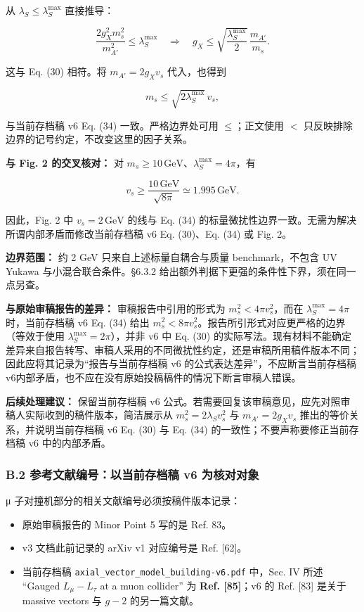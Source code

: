 \documentclass[
]{article}
\providecommand{\tightlist}{%
  \setlength{\itemsep}{0pt}\setlength{\parskip}{0pt}}
\begin{document}
从 \(\lambda_S\leq\lambda_S^{\max}\) 直接推导：

\[
\frac{2g_X^2m_s^2}{m_{A'}^2}\leq\lambda_S^{\max}
\quad\Longrightarrow\quad
 g_X\leq\sqrt{\frac{\lambda_S^{\max}}{2}}\,\frac{m_{A'}}{m_s}.
\]

这与 Eq. (30) 相符。将 \(m_{A'}=2g_Xv_s\) 代入，也得到

\[
 m_s\leq\sqrt{2\lambda_S^{\max}}\,v_s,
\tag{34}
\]

与当前存档稿 v6 Eq. (34) 一致。严格边界处可用 \(\leq\)；正文使用 \(<\)
只反映排除边界的记号约定，不改变这里的因子关系。

\textbf{与 Fig. 2 的交叉核对：} 对
\(m_s\geq10\,\mathrm{GeV}\)、\(\lambda_S^{\max}=4\pi\)，有

\[
 v_s\geq\frac{10\,\mathrm{GeV}}{\sqrt{8\pi}}\simeq1.995\,\mathrm{GeV}.
\]

因此，Fig. 2 中 \(v_s=2\,\mathrm{GeV}\) 的线与 Eq. (34)
的标量微扰性边界一致。无需为解决所谓内部矛盾而修改当前存档稿 v6 Eq.
(30)、Eq. (34) 或 Fig. 2。

\textbf{边界范围：} 约 2 GeV 只来自上述标量自耦合与质量
benchmark，不包含 UV Yukawa 与小混合联合条件。§6.3.2
给出额外判据下更强的条件性下界，须在同一点另查。

\textbf{与原始审稿报告的差异：} 审稿报告中引用的形式为
\(m_s^2<4\pi v_s^2\)，而在 \(\lambda_S^{\max}=4\pi\) 时，当前存档稿 v6
Eq. (34) 给出
\(m_s^2<8\pi v_s^2\)。报告所引形式对应更严格的边界（等效于使用
\(\lambda_S^{\max}=2\pi\)），并非 v6 中 Eq. (30)
的实际写法。现有材料不能确定差异来自报告转写、审稿人采用的不同微扰性约定，还是审稿所用稿件版本不同；因此应将其记录为``报告与当前存档稿
v6 的公式表达差异''，不应断言当前存档稿
v6内部矛盾，也不应在没有原始投稿稿件的情况下断言审稿人错误。

\textbf{后续处理建议：} 保留当前存档稿 v6
公式。若需要回复该审稿意见，应先对照审稿人实际收到的稿件版本，简洁展示从
\(m_s^2=2\lambda_Sv_s^2\) 与 \(m_{A'}=2g_Xv_s\)
推出的等价关系，并说明当前存档稿 v6 Eq. (30) 与 Eq. (34)
的一致性；不要声称要修正当前存档稿 v6 中的内部矛盾。

\subsubsection{B.2 参考文献编号：以当前存档稿 v6
为核对对象}\label{b.2-ux53c2ux8003ux6587ux732eux7f16ux53f7ux4ee5ux5f53ux524dux5b58ux6863ux7a3f-v6-ux4e3aux6838ux5bf9ux5bf9ux8c61}

μ 子对撞机部分的相关文献编号必须按稿件版本记录：

\begin{itemize}
\tightlist
\item
  原始审稿报告的 Minor Point 5 写的是 Ref. 83。
\item
  v3 文档此前记录的 arXiv v1 对应编号是 Ref. {[}62{]}。
\item
  当前存档稿 \texttt{axial\_vector\_model\_building-v6.pdf} 中，Sec. IV
  所述 ``Gauged \(L_\mu-L_\tau\) at a muon collider'' 为 \textbf{Ref.
  {[}85{]}}；v6 的 Ref. {[}83{]} 是关于 massive vectors 与 \(g-2\)
  的另一篇文献。
\end{itemize}
\end{document}
